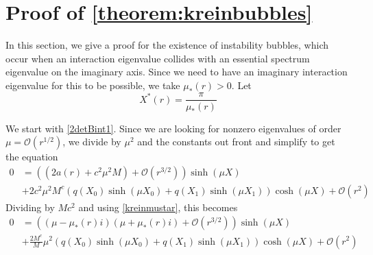\documentclass[thesis.tex]{subfiles}
\begin{document}
\section{Proof of \cref{theorem:kreinbubbles}}

In this section, we give a proof for the existence of instability bubbles, which occur when an interaction eigenvalue collides with an essential spectrum eigenvalue on the imaginary axis. Since we need to have an imaginary interaction eigenvalue for this to be possible, we take $\mu_*(r) > 0$. Let
\[
X^*(r) = \frac{\pi}{\mu_*(r)}
\]

We start with \cref{2detBint1}. Since we are looking for nonzero eigenvalues of order $\mu = \mathcal{O}(r^{1/2})$, we divide by $\mu^2$ and the constants out front and simplify to get the equation
\begin{equation}\label{KreinB1}
\begin{aligned}
0 &= \left( (2a(r) + c^2 \mu^2 M) + \mathcal{O}( r^{3/2} )\right) \sinh(\mu X) \\
&+ 2 c^2 \mu^2 M^c ( q(X_0) \sinh(\mu X_0) + q(X_1) \sinh(\mu X_1) ) \cosh(\mu X) + \mathcal{O}( r^2 ) 
\end{aligned}
\end{equation}
Dividing by $M c^2$ and using \cref{kreinmustar}, this becomes
\begin{equation}\label{KreinB2}
\begin{aligned}
0 &= \left( (\mu - \mu_*(r) i)( \mu + \mu_*(r) i) +  \mathcal{O}( r^{3/2} )\right) \sinh(\mu X) \\
&+\frac{2 M^c}{M} \mu^2 ( q(X_0)\sinh(\mu X_0) + q(X_1) \sinh(\mu X_1) ) \cosh(\mu X) + \mathcal{O}( r^2 ) 
\end{aligned}
\end{equation}
\end{document}
